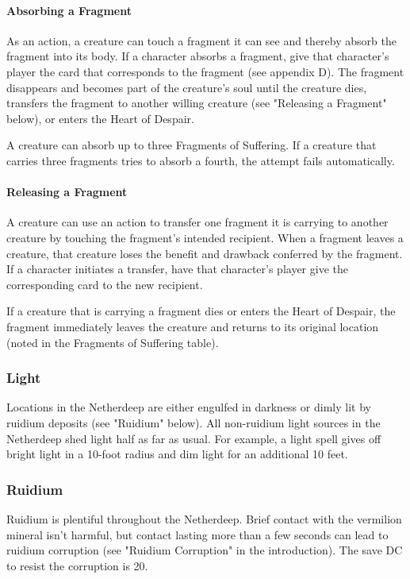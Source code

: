 \documentclass[10pt,a4paper,twoside,bg=print,twocolumn,openany,nodeprecatedcode]{dndbook}
\begin{document}
\paragraph{Absorbing a Fragment}
As an action, a creature can touch a fragment it can see and thereby absorb the fragment into its body. If a character absorbs a fragment, give that character's player the card that corresponds to the fragment (see appendix D). The fragment disappears and becomes part of the creature's soul until the creature dies, transfers the fragment to another willing creature (see "Releasing a Fragment" below), or enters the Heart of Despair.

A creature can absorb up to three Fragments of Suffering. If a creature that carries three fragments tries to absorb a fourth, the attempt fails automatically.

\paragraph{Releasing a Fragment}
A creature can use an action to transfer one fragment it is carrying to another creature by touching the fragment's intended recipient. When a fragment leaves a creature, that creature loses the benefit and drawback conferred by the fragment. If a character initiates a transfer, have that character's player give the corresponding card to the new recipient.

If a creature that is carrying a fragment dies or enters the Heart of Despair, the fragment immediately leaves the creature and returns to its original location (noted in the Fragments of Suffering table).


\subsubsection{Light}
Locations in the Netherdeep are either engulfed in darkness or dimly lit by ruidium deposits (see "Ruidium" below). All non-ruidium light sources in the Netherdeep shed light half as far as usual. For example, a light spell gives off bright light in a 10-foot radius and dim light for an additional 10 feet.

\subsubsection{Ruidium}
Ruidium is plentiful throughout the Netherdeep. Brief contact with the vermilion mineral isn't harmful, but contact lasting more than a few seconds can lead to ruidium corruption (see "Ruidium Corruption" in the introduction). The save DC to resist the corruption is 20.
\end{document}
